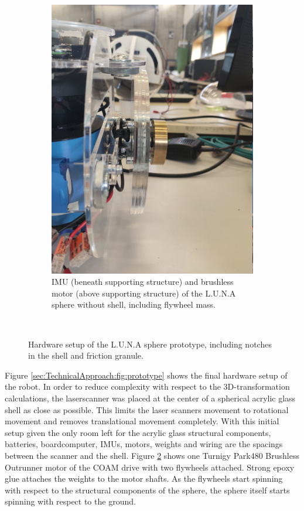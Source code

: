 \begin{figure}
\begin{subfigure}[b]{0.34\textwidth}
        \includegraphics[width=\textwidth]{../Media/sphereRightMotor.jpg}
        \caption{IMU (beneath supporting structure) and brushless motor (above supporting structure) of the L.U.N.A sphere without shell, including flywheel mass. }
        \label{sec:TechnicalApproach:fig:motor}
\end{subfigure}
\\
\caption{Hardware setup of the L.U.N.A sphere prototype, including notches in the shell and friction granule.}
\end{figure}

Figure \ref{sec:TechnicalApproach:fig:prototype} shows the final hardware setup of the robot. In order to reduce complexity with respect to the 3D-transformation calculations, the laserscanner was placed at the center of a spherical acrylic glass shell as close as possible. This limits the laser scanners movement to rotational movement and removes translational movement completely. With this initial setup given the only room left for the acrylic glass structural components, batteries, boardcomputer, IMUs, motors, weights and wiring are the spacings between the scanner and the shell. Figure \ref{sec:TechnicalApproach:fig:motor} shows one Turnigy Park480 Brushless Outrunner motor \cite{turnigymotor} of the COAM drive with two flywheels attached. Strong epoxy glue attaches the weights to the motor shafts. As the flywheels start spinning with respect to the structural components of the sphere, the sphere itself starts spinning with respect to the ground. 

